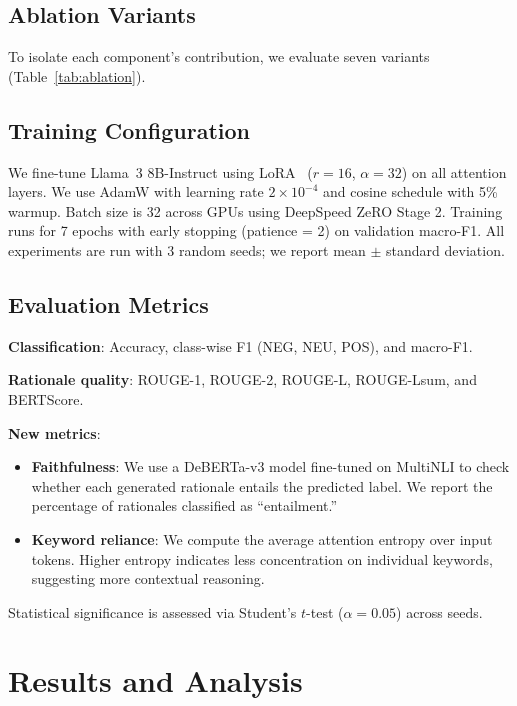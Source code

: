 \documentclass[conference]{IEEEtran}
\begin{document}
\subsection{Ablation Variants}

To isolate each component's contribution, we evaluate seven variants (Table~\ref{tab:ablation}).

\subsection{Training Configuration}

We fine-tune Llama~3 8B-Instruct using LoRA~\cite{hu2021lora} ($r = 16$, $\alpha = 32$) on all attention layers. We use AdamW with learning rate $2 \times 10^{-4}$ and cosine schedule with 5\% warmup. Batch size is 32 across GPUs using DeepSpeed ZeRO Stage 2. Training runs for 7 epochs with early stopping (patience = 2) on validation macro-F1. All experiments are run with 3 random seeds; we report mean $\pm$ standard deviation.

\subsection{Evaluation Metrics}

\textbf{Classification}: Accuracy, class-wise F1 (NEG, NEU, POS), and macro-F1.

\textbf{Rationale quality}: ROUGE-1, ROUGE-2, ROUGE-L, ROUGE-Lsum, and BERTScore.

\textbf{New metrics}:
\begin{itemize}
    \item \textbf{Faithfulness}: We use a DeBERTa-v3 model fine-tuned on MultiNLI to check whether each generated rationale entails the predicted label. We report the percentage of rationales classified as ``entailment.''
    \item \textbf{Keyword reliance}: We compute the average attention entropy over input tokens. Higher entropy indicates less concentration on individual keywords, suggesting more contextual reasoning.
\end{itemize}

Statistical significance is assessed via Student's $t$-test ($\alpha = 0.05$) across seeds.

\section{Results and Analysis}
\end{document}
